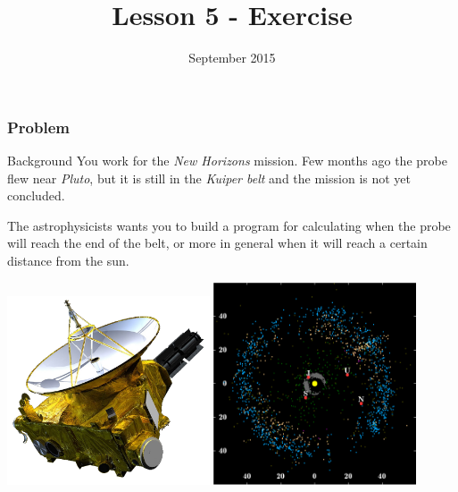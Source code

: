 



\title[Lesson 5]{\textbf{Lesson 5 - Exercise}}
\date[21/9/15]{ September 2015}



\begin{frame}[plain]
  \titlepage
\end{frame}

\begin{frame}
  \frametitle{Problem}
  \begin{block}{Background}
    \footnotesize
    You work for the \emph{New Horizons} mission. Few months ago the
    probe flew near \emph{Pluto}, but it is still in the \emph{Kuiper
      belt} and the mission is not yet concluded.

    The astrophysicists
    wants you to build a program for calculating when the probe will
    reach the end of the belt, or more in general when it  will reach
    a certain distance from the sun.
  \end{block}
  \begin{center}
    \includegraphics[width=0.45\textwidth]{img/New_Horizons.png}
    \includegraphics[width=0.45\textwidth]{img/Kuiper_belt.png}    
  \end{center}
\end{frame}

